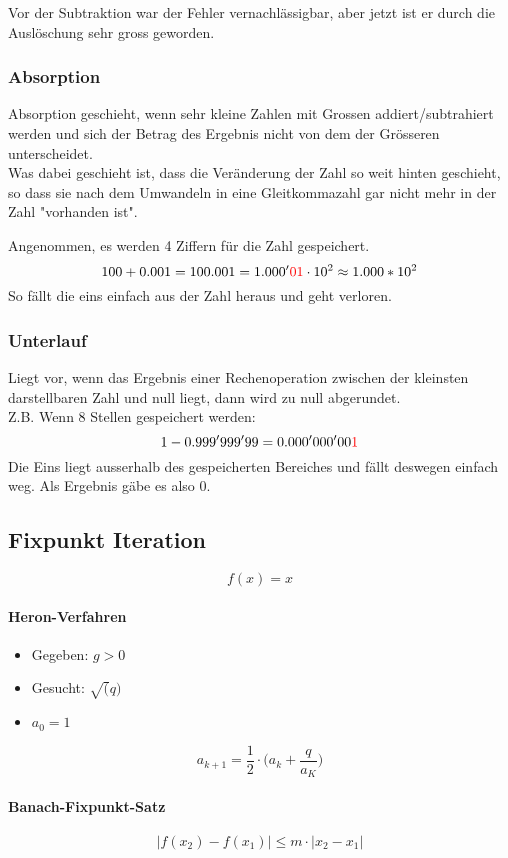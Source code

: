 Vor der Subtraktion war der Fehler vernachlässigbar, aber jetzt ist er durch die Auslöschung sehr gross geworden.

\subsubsection{Absorption}
Absorption geschieht, wenn sehr kleine Zahlen mit Grossen addiert/subtrahiert werden und sich der Betrag des Ergebnis nicht von dem der Grösseren unterscheidet. \\
Was dabei geschieht ist, dass die Veränderung der Zahl so weit hinten geschieht, so dass sie nach dem Umwandeln in eine Gleitkommazahl gar nicht mehr in der Zahl "vorhanden ist".
\begin{exmp}
	Angenommen, es werden 4 Ziffern für die Zahl gespeichert.
	\begin{displaymath}
		100+0.001=100.001 = 1.000'{\color{red}01} \cdot 10^2
		\approx 1.000 * 10^2
	\end{displaymath}
	So fällt die eins einfach aus der Zahl heraus und geht verloren.
\end{exmp}

\subsubsection{Unterlauf}
Liegt vor, wenn das Ergebnis einer Rechenoperation zwischen der kleinsten darstellbaren Zahl und null liegt, dann wird zu null abgerundet. \\
Z.B. Wenn 8 Stellen gespeichert werden:
\begin{displaymath}
	1-0.999'999'99 = 0.000'000'00 {\color{red} 1}
\end{displaymath}
Die Eins liegt ausserhalb des gespeicherten Bereiches und fällt deswegen einfach weg. Als Ergebnis gäbe es also  0.

\subsection{Fixpunkt Iteration}

\begin{displaymath}
	f(x) = x
\end{displaymath}

\paragraph{Heron-Verfahren}

\begin{itemize}
	\item Gegeben: $g > 0$
	\item Gesucht: $\sqrt(q)$
	\item $a_0 = 1$
\end{itemize}

\begin{displaymath}
	a_{k+1} = \frac{1}{2} \cdot \biggl ( a_k + \frac{q}{a_K } \biggr )
\end{displaymath}

\paragraph{Banach-Fixpunkt-Satz}

\begin{displaymath}
	|f(x_2) - f(x_1)| \leq	m \cdot |x_2 - x_1|
\end{displaymath}